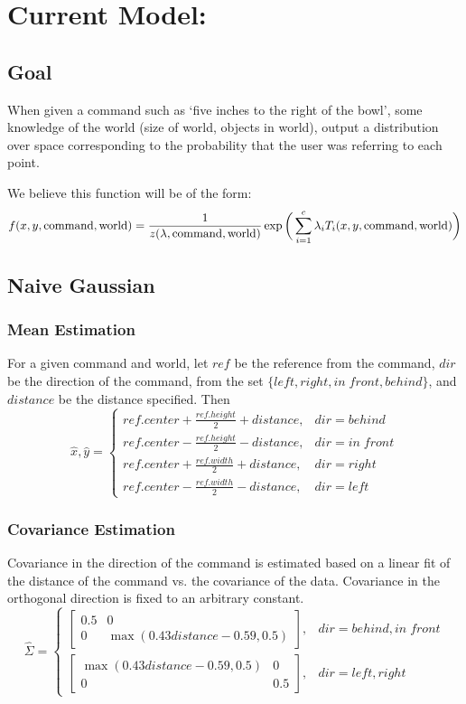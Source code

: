 \documentclass[12pt,letterpaper]{article}
\begin{document}
\section*{Current Model:}

\subsection{Goal}
When given a command such as `five inches to the right of the bowl', some knowledge of the world (size of world, objects in world), output a distribution over space corresponding to the probability that the user was referring to each point.

We believe this function will be of the form:
\[
f(x, y, \textmd{command}, \textmd{world}) = \frac{1}{z(\lambda, \textmd{command}, \textmd{world})}\exp\bigg(\sum_{i = 1}^c \lambda_iT_i(x, y, \textmd{command}, \textmd{world})\bigg)
\]

\subsection{Naive Gaussian}
\subsubsection*{Mean Estimation}
For a given command and world, let $ref$ be the reference from the command, $dir$ be the direction of the command, from the set $\{left, right, in\;front, behind\}$, and $distance$ be the distance specified. Then
\[
\hat{x}, \hat{y} = \begin{cases} ref.center + \frac{ref.height}{2} + distance, & dir = behind \\
ref.center - \frac{ref.height}{2} - distance, & dir = in\;front \\
 ref.center + \frac{ref.width}{2} + distance, & dir = right \\
 ref.center - \frac{ref.width}{2} - distance, & dir = left \end{cases}
\]

\subsubsection*{Covariance Estimation}
Covariance in the direction of the command is estimated based on a linear fit of the distance of the command vs. the covariance of the data. Covariance in the orthogonal direction is fixed to an arbitrary constant.
\[
\hat{\Sigma} = \begin{cases}
\begin{bmatrix} 0.5 & 0 \\ 0 & \max(0.43distance - 0.59, 0.5) \end{bmatrix}, & dir = behind, in\;front\\
\begin{bmatrix} \max(0.43distance - 0.59, 0.5) & 0 \\ 0 & 0.5 \end{bmatrix}, & dir = left, right
\end{cases}
\]
\end{document}
